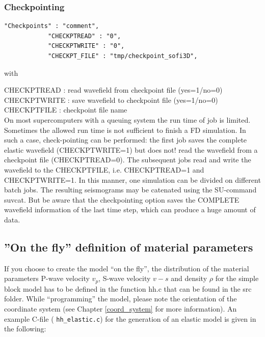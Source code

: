 \documentclass[11pt,onecolumn,oneside]{article}
\begin{document}
\subsubsection{Checkpointing}
\begin{verbatim}
"Checkpoints" : "comment",
            "CHECKPTREAD" : "0",
            "CHECKPTWRITE" : "0",
            "CHECKPT_FILE" : "tmp/checkpoint_sofi3D",
\end{verbatim}

with 

CHECKPTREAD : read wavefield from checkpoint file (yes=1/no=0)\\
CHECKPTWRITE : save wavefield to checkpoint file (yes=1/no=0)\\
CHECKPTFILE : checkpoint file name\\

On most supercomputers with a queuing system the run time of job is limited. Sometimes the allowed run time is not sufficient to finish a FD simulation. In such a case, check-pointing can be performed: the first job saves the complete elastic wavefield (CHECKPTWRITE=1) but does not! read the wavefield from a checkpoint file (CHECKPTREAD=0). The subsequent jobs read and write the wavefield to the CHECKPTFILE, i.e. CHECKPTREAD=1 and CHECKPTWRITE=1. In this manner, one simulation can be divided on different batch jobs. The resulting seismograms may be catenated using the SU-command suvcat. But be aware that the checkpointing option saves the COMPLETE wavefield information of the last time step, which can produce a huge amount of data.

\subsection{''On the fly'' definition of material parameters}
\label{model_def_func}
If you choose to create the model ``on the fly'', the distribution of the material parameters P-wave velocity $v_p$, S-wave velocity $v-s$ and density $\rho$ for the simple block model has to be defined in the function hh.c that can be found in the src folder. While ``programming'' the model, please note the orientation of the coordinate system (see Chapter \ref{coord_system} for more information). An example C-file ( \lstinline{hh_elastic.c}) for the generation of an elastic model is given in the following:


\end{document}
